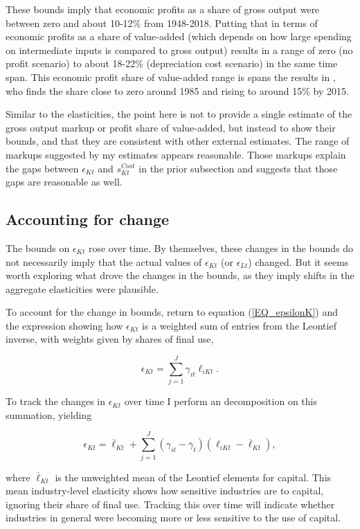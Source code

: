 \documentclass[11pt]{article}
\begin{document}
These bounds imply that economic profits as a share of gross output were between zero and about 10-12\% from 1948-2018. Putting that in terms of economic profits as a share of value-added (which depends on how large spending on intermediate inputs is compared to gross output) results in a range of zero (no profit scenario) to about 18-22\% (depreciation cost scenario) in the same time span. This economic profit share of value-added range is spans the results in \cite{Barkai000}, who finds the share close to zero around 1985 and rising to around 15\% by 2015. 

Similar to the elasticities, the point here is not to provide a single estimate of the gross output markup or profit share of value-added, but instead to show their bounds, and that they are consistent with other external estimates. The range of markups suggested by my estimates appears reasonable. Those markups explain the gaps between $\epsilon_{Kt}$ and $s^{Cost}_{Kt}$ in the prior subsection and suggests that those gaps are reasonable as well.

\subsection{Accounting for change}
The bounds on $\epsilon_{Kt}$ rose over time. By themselves, these changes in the bounds do not necessarily imply that the actual values of $\epsilon_{Kt}$ (or $\epsilon_{Lt}$) changed. But it seems worth exploring what drove the changes in the bounds, as they imply shifts in the aggregate elasticities were plausible.

To account for the change in bounds, return to equation (\ref{EQ_epsilonK}) and the expression showing how $\epsilon_{Kt}$ is a weighted sum of entries from the Leontief inverse, with weights given by shares of final use,

\begin{equation}
	\epsilon_{Kt} = \sum_{j=1}^J \gamma_{it} \ell_{iKt}. \nonumber
\end{equation}

To track the changes in $\epsilon_{Kt}$ over time I perform an \cite{op1996} decomposition on this summation, yielding

\begin{equation}
	\epsilon_{Kt} = \overline{\ell}_{Kt} + \sum_{j=1}^J (\gamma_{it} - \overline{\gamma}_{t})(\ell_{iKt}-\overline{\ell}_{Kt}), \label{EQ_op}
\end{equation}

where $\overline{\ell}_{Kt}$ is the unweighted mean of the Leontief elements for capital. This mean industry-level elasticity shows how sensitive industries are to capital, ignoring their share of final use. Tracking this over time will indicate whether industries in general were becoming more or less sensitive to the use of capital.
\end{document}
